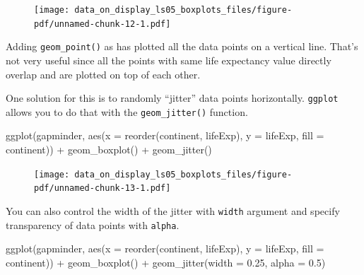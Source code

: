 \documentclass[
  letterpaper,
  DIV=11,
  numbers=noendperiod]{scrreprt}
\newenvironment{Shaded}{\begin{snugshade}}{\end{snugshade}}
\newcommand{\AttributeTok}[1]{\textcolor[rgb]{0.40,0.45,0.13}{#1}}
\newcommand{\FloatTok}[1]{\textcolor[rgb]{0.68,0.00,0.00}{#1}}
\newcommand{\FunctionTok}[1]{\textcolor[rgb]{0.28,0.35,0.67}{#1}}
\newcommand{\NormalTok}[1]{\textcolor[rgb]{0.00,0.23,0.31}{#1}}
\newcommand{\SpecialCharTok}[1]{\textcolor[rgb]{0.37,0.37,0.37}{#1}}
\begin{document}
\begin{figure}[H]

{\centering \texttt{[image: data\_on\_display\_ls05\_boxplots\_files/figure-pdf/unnamed-chunk-12-1.pdf]}

}

\end{figure}

Adding \texttt{geom\_point()} as has plotted all the data points on a
vertical line. That's not very useful since all the points with same
life expectancy value directly overlap and are plotted on top of each
other.

One solution for this is to randomly ``jitter'' data points
horizontally. \texttt{ggplot} allows you to do that with the
\texttt{geom\_jitter()} function.

\begin{Shaded}
\begin{Highlighting}[]
\FunctionTok{ggplot}\NormalTok{(gapminder, }
       \FunctionTok{aes}\NormalTok{(}\AttributeTok{x =} \FunctionTok{reorder}\NormalTok{(continent, lifeExp), }
           \AttributeTok{y =}\NormalTok{ lifeExp,}
           \AttributeTok{fill =}\NormalTok{ continent)) }\SpecialCharTok{+}
  \FunctionTok{geom\_boxplot}\NormalTok{() }\SpecialCharTok{+}
  \FunctionTok{geom\_jitter}\NormalTok{()}
\end{Highlighting}
\end{Shaded}

\begin{figure}[H]

{\centering \texttt{[image: data\_on\_display\_ls05\_boxplots\_files/figure-pdf/unnamed-chunk-13-1.pdf]}

}

\end{figure}

You can also control the width of the jitter with \texttt{width}
argument and specify transparency of data points with \texttt{alpha}.

\begin{Shaded}
\begin{Highlighting}[]
\FunctionTok{ggplot}\NormalTok{(gapminder, }
       \FunctionTok{aes}\NormalTok{(}\AttributeTok{x =} \FunctionTok{reorder}\NormalTok{(continent, lifeExp), }
           \AttributeTok{y =}\NormalTok{ lifeExp,}
           \AttributeTok{fill =}\NormalTok{ continent)) }\SpecialCharTok{+}
  \FunctionTok{geom\_boxplot}\NormalTok{() }\SpecialCharTok{+}
  \FunctionTok{geom\_jitter}\NormalTok{(}\AttributeTok{width =} \FloatTok{0.25}\NormalTok{, }
              \AttributeTok{alpha =} \FloatTok{0.5}\NormalTok{)}
\end{Highlighting}
\end{Shaded}
\end{document}
